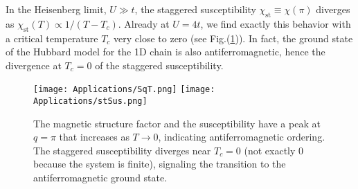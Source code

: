 %
In the Heisenberg limit, $U \gg t$, the staggered susceptibility $\chi_{\text{st}} \equiv \chi (\pi)$ diverges as $\chi_{\text{st}} ( T ) \propto 1 / (T - T_c) $.
Already at $U = 4 t$, we find exactly this behavior with a critical temperature $T_c$ very close to zero (see Fig.(\ref{fig:SchiPi})).
In fact, the ground state of the Hubbard model for the 1D chain is also antiferromagnetic, hence the divergence at $T_c = 0$ of the staggered susceptibility.
\vspace{-0.4cm}
\begin{figure}[H]
\texttt{[image: Applications/SqT.png]}
\texttt{[image: Applications/stSus.png]}
\caption[The magnetic structure factor and the  susceptibility have a peak at $q = \pi$ that increases as $T\rightarrow 0$, indicating \emph{antiferromagnetic ordering}.
 Divergence of the staggered susceptibility near $T_c = 0$, signaling the transition to the antiferromagnetic ground state.]{The magnetic structure factor and the susceptibility have a peak at $q = \pi$ that increases as $T\rightarrow 0$, indicating antiferromagnetic ordering.
The staggered susceptibility diverges near $T_c = 0$ (not exactly 0 because the system is finite), signaling the transition to the antiferromagnetic ground state.\label{fig:SchiPi}}
\end{figure}

